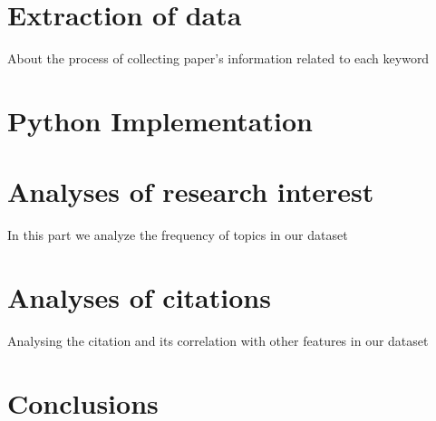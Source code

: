 \documentclass{article}
\begin{document}
\section{Extraction of data }
About the process of collecting paper's information related to each keyword

\section{Python Implementation}


\section{Analyses of research interest}
In this part we analyze the frequency of topics in our dataset





\section{Analyses of citations}
Analysing the citation and its correlation with other features in our dataset




\section{Conclusions} 



\end{document}
